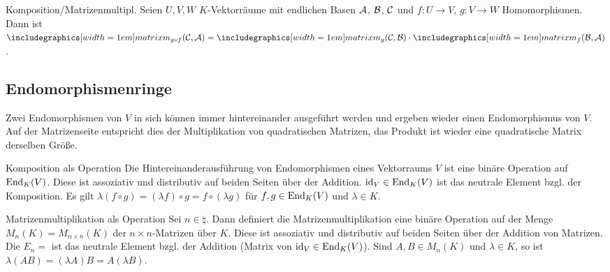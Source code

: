 \begin{Satz}{Komposition/Matrizenmultipl.}
    Seien $U, V, W$ $K$-Vektorräume mit endlichen Basen
    $\mathcal{A}$, $\mathcal{B}$, $\mathcal{C}$ und $f: U \rightarrow V$,
    $g: V \rightarrow W$ Homomorphismen.
    Dann ist $\hommatrix{g \circ f}{C}{A} = \hommatrix{g}{C}{B} \cdot
    \hommatrix{f}{B}{A}$.
\end{Satz}

\subsection{%
    Endomorphismenringe%
}

\begin{Bem}
    Zwei Endomorphismen von $V$ in sich können immer hintereinander ausgeführt
    werden und ergeben wieder einen Endomorphismus von $V$.
    Auf der Matrizenseite entspricht dies der Multiplikation von quadratischen
    Matrizen, das Produkt ist wieder eine quadratische Matrix derselben Größe.
\end{Bem}

\begin{Satz}{Komposition als Operation}
    Die Hintereinanderausführung von Endomorphismen eines Vektorraums $V$ ist
    eine binäre Operation auf $\operatorname{End}_K(V)$.
    Diese ist assoziativ und distributiv auf beiden Seiten über der Addition.
    $\operatorname{id}_V \in \operatorname{End}_K(V)$ ist das neutrale Element bzgl. der Komposition.
    Es gilt $\lambda (f \circ g) = (\lambda f) \circ g = f \circ (\lambda g)$
    für $f, g \in \operatorname{End}_K(V)$ und $\lambda \in K$.
\end{Satz}

\begin{Satz}{Matrizenmultiplikation als Operation}
    Sei $n \in \natural$.
    Dann definiert die Matrizenmultiplikation eine binäre Operation auf der
    Menge $M_n(K) = M_{n \times n}(K)$ der $n \times n$-Matrizen über $K$.
    Diese ist assoziativ und distributiv auf beiden Seiten über der Addition
    von Matrizen. \\
    Die  $E_n =$%
    ist das neutrale Element bzgl. der Addition
    (Matrix von $\operatorname{id}_V \in \operatorname{End}_K(V)$).
    Sind $A, B \in M_{n}(K)$ und $\lambda \in K$, so ist
    $\lambda (AB) = (\lambda A) B = A (\lambda B)$.
\end{Satz}

